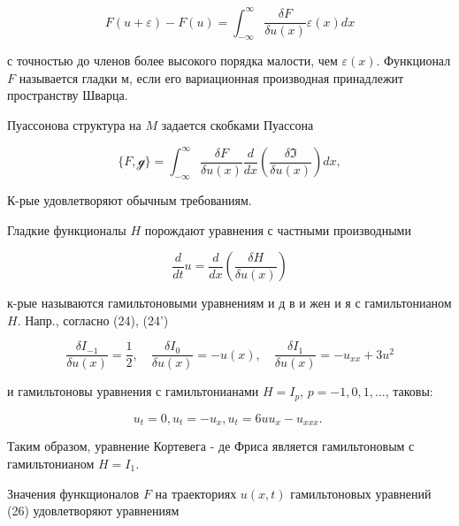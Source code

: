 \documentclass[10pt]{article}
\begin{document}
\[

F(u+\varepsilon)-F(u)=\int_{-\infty}^{\infty} \frac{\delta F}{\delta u(x)} \varepsilon(x) d x

\]



с точностью до членов более высокого порядка малости, чем $\varepsilon(x)$. Функционал $F$ называется гладки м, если его вариационная производная принадлежит пространству Шварца.



Пуассонова структура на $M$ задается скобками Пуассона



\[

\{F, \mathscr{g}\}=\int_{-\infty}^{\infty} \frac{\delta F}{\delta u(x)} \frac{d}{d x}\left(\frac{\delta \mathfrak{I}}{\delta u(x)}\right) d x,

\]



К-рые удовлетворяют обычным требованиям.



Гладкие функционалы $H$ порождают уравнения с частными производными



\[

\frac{d}{d t} u=\frac{d}{d x}\left(\frac{\delta H}{\delta u(x)}\right)

\]



к-рые называются гамильтоновыми уравнениям и д в и жен и я с гамильтонианом $H$. Напр., согласно (24), (24')



\[

\frac{\delta I_{-1}}{\delta u(x)}=\frac{1}{2}, \quad \frac{\delta I_{0}}{\delta u(x)}=-u(x), \quad \frac{\delta I_{1}}{\delta u(x)}=-u_{x x}+3 u^{2}

\]



и гамильтоновы уравнения с гамильтонианами $H=I_{p}$, $p=-1,0,1, \ldots$, таковы:



\[

u_{t}=0, u_{t}=-u_{x}, u_{t}=6 u u_{x}-u_{x x x} \text {. }

\]



Таким образом, уравнение Кортевега - де Фриса является гамильтоновым с гамильтонианом $H=I_{1}$.



Значения функщионалов $F$ на траекториях $u(x, t)$ гамильтоновых уравнений (26) удовлетворяют уравнениям
\end{document}
